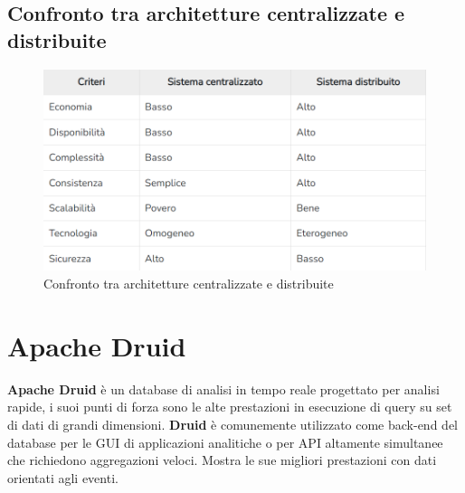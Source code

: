 \documentclass{article}
\begin{document}
\subsection{Confronto tra  architetture centralizzate e distribuite}
\begin{figure}[H]
    \centering
\includegraphics[scale=0.5]{images/central_vs_distribution.png}
    \caption{Confronto tra architetture centralizzate e distribuite}
    
\end{figure}

\section{Apache Druid}
\textbf{Apache Druid} è un database di analisi in tempo reale progettato per analisi rapide, i suoi punti di forza sono le alte prestazioni in esecuzione di query su set di dati di grandi dimensioni.
\textbf{Druid} è comunemente utilizzato come back-end del database per le GUI di applicazioni analitiche o per API altamente simultanee che richiedono aggregazioni veloci. Mostra le sue migliori prestazioni con dati orientati agli eventi.
\end{document}
